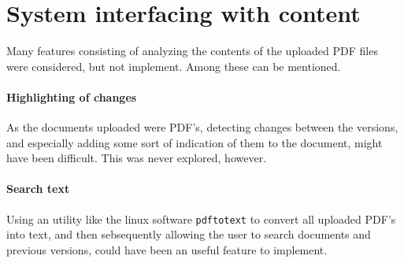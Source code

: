 \documentclass[../../master.tex]{subfiles}
\begin{document}
\section{System interfacing with content}
Many features consisting of analyzing the contents of the uploaded PDF files were considered, but not implement. Among these can be mentioned.

\paragraph{Highlighting of changes}
As the documents uploaded were PDF's, detecting changes between the versions, and especially adding some sort of indication of them to the document, might have been difficult.
This was never explored, however.
\paragraph{Search text}
Using an utility like the linux software \texttt{pdftotext} to convert all uploaded PDF's into text, and then sebsequently allowing the user to search documents and previous versions, could have been an useful feature to implement.
\end{document}
